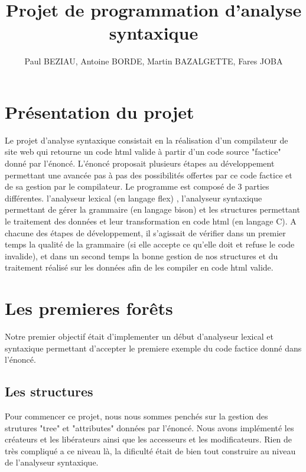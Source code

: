 \documentclass[12pt]{article}
\begin{document}
\title{Projet de programmation d'analyse syntaxique}
\author{Paul BEZIAU, Antoine BORDE, Martin BAZALGETTE, Fares JOBA}

\maketitle
\newpage
\tableofcontents
\newpage


\section{Présentation du projet}
Le projet d'analyse syntaxique consistait en la réalisation d'un compilateur
de site web qui retourne un code html valide à partir d'un code source "factice"
donné par l'énoncé.
\newline
L'énoncé proposait plusieurs étapes au développement permettant une avancée
pas à pas des possibilités offertes par ce code factice et de sa gestion
par le compilateur.
\newline
Le programme est composé de 3 parties différentes. l'analyseur lexical (en langage flex) ,
l'analyseur syntaxique permettant de gérer la grammaire (en langage bison) et les structures
permettant le traitement des données et leur transformation en code html (en langage C).
\newline
A chacune des étapes de développement, il s'agissait de vérifier dans un premier
temps la qualité de la grammaire (si elle accepte ce qu'elle doit et refuse
le code invalide), et dans un second temps la bonne gestion de nos structures
et du traitement réalisé sur les données afin de les compiler en code html valide.

\newpage

\section{Les premieres forêts}

Notre premier objectif était d'implementer un début d'analyseur lexical et syntaxique
permettant d'accepter le premiere exemple du code factice donné dans l'énoncé.

\subsection{Les structures}

Pour commencer ce projet, nous nous sommes penchés sur la gestion des strutures
"tree" et "attributes" données par l'énoncé. Nous avons implémenté les créateurs et les
libérateurs ainsi que les accesseurs et les modificateurs. Rien de très compliqué a ce niveau
là, la dificulté était de bien tout construire au niveau de l'analyseur syntaxique.
\end{document}
